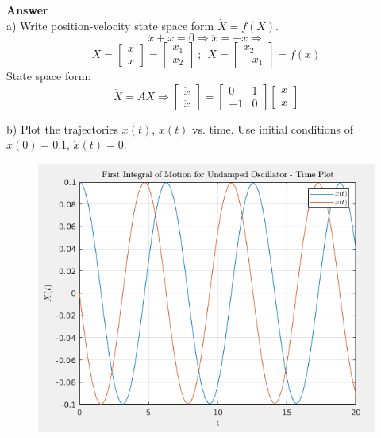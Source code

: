 \documentclass{homeworg}
\begin{document}
\noindent
\textbf{Answer} \\
a) Write position-velocity state space form \(\dot{X} = f(X)\).
\begin{equation*}
  \ddot{x} + x = 0 \Rightarrow \ddot{x} = -x \Rightarrow
\end{equation*}
\begin{equation*}
  X =
  \begin{bmatrix}
    x \\
    \dot{x}
  \end{bmatrix}
  = \begin{bmatrix}
    x_1 \\
    x_2
  \end{bmatrix} ~;~~ \dot{X} =
  \begin{bmatrix}
    x_2 \\
    - x_1
  \end{bmatrix} = f(x)
\end{equation*}
State space form:
\begin{equation*}
  \dot{X} = AX \Rightarrow
  \begin{bmatrix}
    \dot{x} \\
    \ddot{x}
  \end{bmatrix} =
  \begin{bmatrix}
    0 & 1 \\
    -1 & 0
  \end{bmatrix}
  \begin{bmatrix}
    x \\
    \dot{x}
  \end{bmatrix}
\end{equation*}

\newpage
b) Plot the trajectories \(x(t)\), \(\dot{x}(t)\) vs. time. Use initial conditions of \(x(0)=0.1\), \(\dot{x}(t)=0\).
\begin{figure}[h]
  \includegraphics[width=.45\textwidth]{fig01.png}
  \centering
\end{figure}
\end{document}
